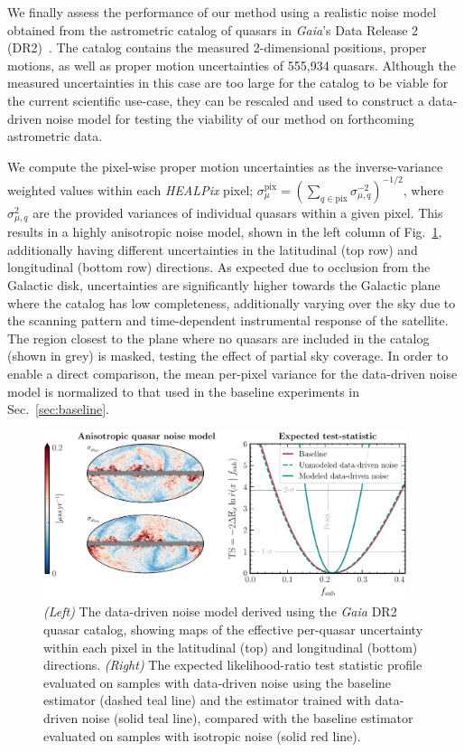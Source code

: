 \documentclass[twocolumn]{aastex631}
\newcommand{\package}[1]{\textsl{#1}\xspace}
\newcommand{\healpix}{\package{HEALPix}}
\begin{document}
{We finally assess the performance of our method using a realistic noise model obtained from the astrometric catalog of quasars in \emph{Gaia}'s Data Release 2 (DR2)~\citep{2018A&A...616A...1G,2018A&A...616A...2L}. The catalog contains the measured 2-dimensional positions, proper motions, as well as proper motion uncertainties of 555,934 quasars. Although the measured uncertainties in this case are too large for the catalog to be viable for the current scientific use-case, they can be rescaled and used to construct a data-driven noise model for testing the viability of our method on forthcoming astrometric data.

We compute the pixel-wise proper motion uncertainties as the inverse-variance weighted values within each \healpix pixel; $\sigma_{\mu}^\mathrm{pix} = \left(\sum_{q\in\mathrm{pix}}\sigma_{\mu, q}^{-2}\right)^{-1/2}$, where $\sigma_{\mu, q}^{2}$ are the provided variances of individual quasars within a given pixel. This results in a highly anisotropic noise model, shown in the left column of Fig.~\ref{fig:anisotropic_noise}, additionally having different uncertainties in the latitudinal (top row) and longitudinal (bottom row) directions. As expected due to occlusion from the Galactic disk, uncertainties are significantly higher towards the Galactic plane where the catalog has low completeness, additionally varying over the sky due to the scanning pattern and time-dependent instrumental response of the satellite. The region closest to the plane where no quasars are included in the catalog (shown in grey) is masked, testing the effect of partial sky coverage. In order to enable a direct comparison, the mean per-pixel variance for the data-driven noise model is normalized to that used in the baseline experiments in Sec.~\ref{sec:baseline}.

\begin{figure}[!htbp]
\centering
\includegraphics[width=0.95\textwidth]{figures/anisotropic_noise}
\caption{{\emph{(Left)} The data-driven noise model derived using the \emph{Gaia} DR2 quasar catalog, showing maps of the effective per-quasar uncertainty within each pixel in the latitudinal (top) and longitudinal (bottom) directions. \emph{(Right)} The expected likelihood-ratio test statistic profile evaluated on samples with data-driven noise using the baseline estimator (dashed teal line) and the estimator trained with data-driven noise (solid teal line), compared with the baseline estimator evaluated on samples with isotropic noise (solid red line).}}
\label{fig:anisotropic_noise}
\end{figure}

}
\end{document}
